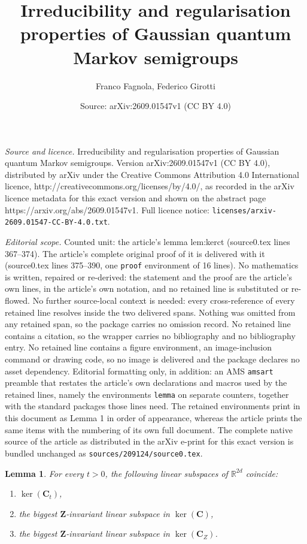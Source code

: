 \documentclass[10pt,a4paper]{amsart}
\title{Irreducibility and regularisation properties of Gaussian quantum Markov semigroups}
\author{Franco Fagnola, Federico Girotti}
\date{Source: arXiv:2609.01547v1 (CC BY 4.0)}
\newtheorem{lemma}{Lemma}
\def\RR{\mathbb{R}}
\begin{document}
\maketitle

\noindent\emph{Source and licence.} Irreducibility and regularisation properties of Gaussian quantum Markov semigroups. Version arXiv:2609.01547v1 (CC BY 4.0), distributed by arXiv under the Creative Commons Attribution 4.0 International licence, http://creativecommons.org/licenses/by/4.0/, as recorded in the arXiv licence metadata for this exact version and shown on the abstract page https://arxiv.org/abs/2609.01547v1. Full licence notice: \texttt{licenses/arxiv-2609.01547-CC-BY-4.0.txt}.\par\smallskip

\noindent\textit{Editorial scope.} Counted unit: the article's lemma lem:kerct (source0.tex lines 367--374). The article's complete original proof of it is delivered with it (source0.tex lines 375--390, one \texttt{proof} environment of 16 lines). No mathematics is written, repaired or re-derived: the statement and the proof are the article's own lines, in the article's own notation, and no retained line is substituted or re-flowed.  No further source-local context is needed: every cross-reference of every retained line resolves inside the two delivered spans.  Nothing was omitted from any retained span, so the package carries no omission record.  No retained line contains a citation, so the wrapper carries no bibliography and no bibliography entry.  No retained line contains a figure environment, an image-inclusion command or drawing code, so no image is delivered and the package declares no asset dependency.  Editorial formatting only, in addition: an AMS \texttt{amsart} preamble that restates the article's own declarations and macros used by the retained lines, namely the environments \texttt{lemma} on separate counters, together with the standard packages those lines need.  The retained environments print in this document as Lemma 1 in order of appearance, whereas the article prints the same items with the numbering of its own full document.  The complete native source of the article as distributed in the arXiv e-print for this exact version is bundled unchanged as \texttt{sources/209124/source0.tex}.
\begin{lemma} \label{lem:kerct}
For every $t >0$, the following linear subspaces of $\RR^{2d}$ coincide:
\begin{enumerate}
    \item $\ker(\mathbf{C}_t)$,
    \item the biggest $\mathbf{Z}$-invariant linear subspace in $\ker(\mathbf{C})$,
    \item the biggest $\mathbf{Z}$-invariant linear subspace in $\ker(\mathbf{C}_{Z})$.
\end{enumerate}
\end{lemma}
\end{document}
